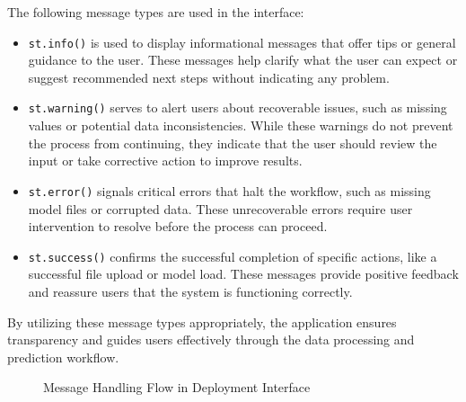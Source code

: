 The following message types are used in the interface:

\begin{itemize}
	\item \texttt{st.info()} is used to display informational messages that offer tips or general guidance to the user. These messages help clarify what the user can expect or suggest recommended next steps without indicating any problem.
	
	\item \texttt{st.warning()} serves to alert users about recoverable issues, such as missing values or potential data inconsistencies. While these warnings do not prevent the process from continuing, they indicate that the user should review the input or take corrective action to improve results.
	
	\item \texttt{st.error()} signals critical errors that halt the workflow, such as missing model files or corrupted data. These unrecoverable errors require user intervention to resolve before the process can proceed.
	
	\item \texttt{st.success()} confirms the successful completion of specific actions, like a successful file upload or model load. These messages provide positive feedback and reassure users that the system is functioning correctly.
\end{itemize}

By utilizing these message types appropriately, the application ensures transparency and guides users effectively through the data processing and prediction workflow.

\begin{figure}[H]
	\centering
	\caption{Message Handling Flow in Deployment Interface}
\end{figure}



